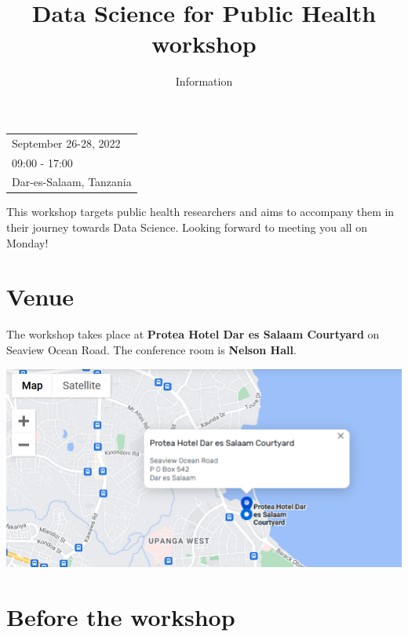 \documentclass[
  letterpaper,
  DIV=11,
  numbers=noendperiod]{scrartcl}
\title{Data Science for Public Health workshop}
\subtitle{Information}
\author{}
\date{}
\begin{document}
\maketitle
\ifdefined\Shaded\renewenvironment{Shaded}{\begin{tcolorbox}[sharp corners, frame hidden, breakable, interior hidden, enhanced, boxrule=0pt, borderline west={3pt}{0pt}{shadecolor}]}{\end{tcolorbox}}\fi

\begin{longtable}[]{@{}l@{}}
\toprule()
\endhead
September 26-28, 2022 \\
09:00 - 17:00 \\
Dar-es-Salaam, Tanzania \\
\bottomrule()
\end{longtable}

This workshop targets public health researchers and aims to accompany
them in their journey towards Data Science. Looking forward to meeting
you all on Monday!

\hypertarget{venue}{%
\section{Venue}\label{venue}}

The workshop takes place at \textbf{Protea Hotel Dar es Salaam
Courtyard} on Seaview Ocean Road. The conference room is \textbf{Nelson
Hall}.

\includegraphics{images/paste-67B4C38F.png}

\hypertarget{before-the-workshop}{%
\section{Before the workshop}\label{before-the-workshop}}
\end{document}

